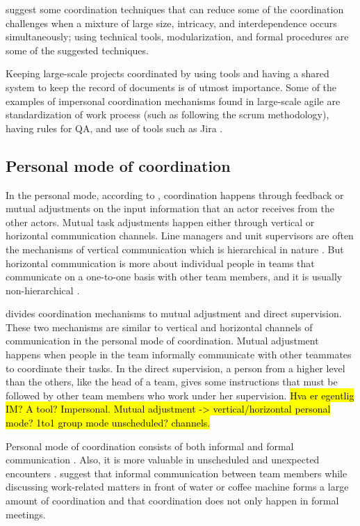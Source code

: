 \citet{Kraut1995a} suggest some coordination techniques that can reduce some of the coordination challenges when a mixture of large size, intricacy, and interdependence occurs simultaneously;  using technical tools, modularization, and formal procedures are some of the suggested techniques.

Keeping large-scale projects coordinated by using tools and having a shared system to keep the record of documents is of utmost importance. Some of the examples of impersonal coordination mechanisms found in large-scale agile are standardization of work process (such as following the scrum methodology), having rules for QA, and use of tools such as Jira \citep{Nyrud2017b}.
\subsection{Personal mode of coordination}
In the personal mode, according to \citet{VanDeVen1976}, coordination happens through feedback or mutual adjustments on the input information that an actor receives from the other actors. Mutual task adjustments happen either through vertical or horizontal communication channels.
Line managers and unit supervisors are often the mechanisms of vertical communication which is hierarchical in nature \citep{Thompson2014}. But horizontal communication is more about individual people in teams that communicate on a one-to-one basis with other team members, and it is usually non-hierarchical \citep{VanDeVen1976}.

\citet{Mintzberg1980} divides coordination mechanisms to mutual adjustment and direct supervision. These two mechanisms are similar to vertical and horizontal channels of communication in the personal mode of coordination. Mutual adjustment happens when people in the team informally communicate with other teammates to coordinate their tasks. In the direct supervision, a person from a higher level than the others, like the head of a team, gives some instructions that must be followed by other team members who work under her supervision.
\hl{Hva er egentlig IM? A tool? Impersonal. Mutual adjustment -> vertical/horizontal personal mode? 1to1 group mode unscheduled? channels.}

Personal mode of coordination consists of both informal and formal communication \citep{Kraut1995a}. Also, it is more valuable in unscheduled and unexpected encounters \citep{Boos2011,Dickenson1997}. \citet{Kraut1995a} suggest that informal communication between team members while discussing work-related matters in front of water or coffee machine forms a large amount of coordination and that coordination does not only happen in formal meetings.

